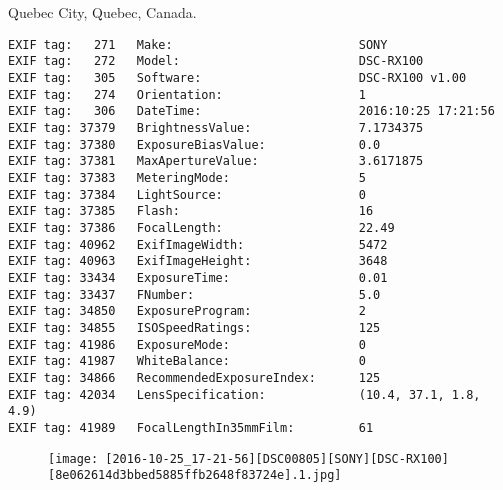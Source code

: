 \section{\protect{}}
\noindent Quebec City, Quebec, Canada.
\noindent
\begin{lstlisting}
EXIF tag:   271   Make:                          SONY
EXIF tag:   272   Model:                         DSC-RX100
EXIF tag:   305   Software:                      DSC-RX100 v1.00
EXIF tag:   274   Orientation:                   1
EXIF tag:   306   DateTime:                      2016:10:25 17:21:56
EXIF tag: 37379   BrightnessValue:               7.1734375
EXIF tag: 37380   ExposureBiasValue:             0.0
EXIF tag: 37381   MaxApertureValue:              3.6171875
EXIF tag: 37383   MeteringMode:                  5
EXIF tag: 37384   LightSource:                   0
EXIF tag: 37385   Flash:                         16
EXIF tag: 37386   FocalLength:                   22.49
EXIF tag: 40962   ExifImageWidth:                5472
EXIF tag: 40963   ExifImageHeight:               3648
EXIF tag: 33434   ExposureTime:                  0.01
EXIF tag: 33437   FNumber:                       5.0
EXIF tag: 34850   ExposureProgram:               2
EXIF tag: 34855   ISOSpeedRatings:               125
EXIF tag: 41986   ExposureMode:                  0
EXIF tag: 41987   WhiteBalance:                  0
EXIF tag: 34866   RecommendedExposureIndex:      125
EXIF tag: 42034   LensSpecification:             (10.4, 37.1, 1.8, 4.9)
EXIF tag: 41989   FocalLengthIn35mmFilm:         61

\end{lstlisting}
\clearpage
\begin{figure}
\raggedleft
\texttt{[image: [2016-10-25\_17-21-56][DSC00805][SONY][DSC-RX100][8e062614d3bbed5885ffb2648f83724e].1.jpg]}
\end{figure}


\clearpage

